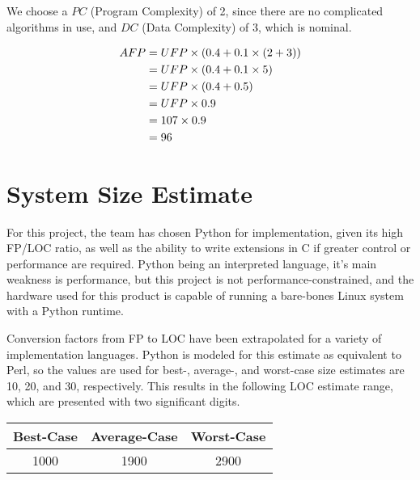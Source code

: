 \documentclass[11pt]{article}
\begin{document}
We choose a $PC$ (Program Complexity) of 2, since there are no complicated algorithms in use, and
$DC$ (Data Complexity) of 3, which is nominal.

\begin{align}
  AFP & = UFP \times (0.4 + 0.1 \times (2 + 3)) \notag \\
      & = UFP \times (0.4 + 0.1 \times 5) \notag \\
      & = UFP \times (0.4 + 0.5) \notag \\
      & = UFP \times 0.9 \notag \\
      & = 107 \times 0.9 \notag \\
      & = 96 \notag
\end{align}

\section{System Size Estimate}
For this project, the team has chosen Python for implementation, given its high FP/LOC ratio, as
well as the ability to write extensions in C if greater control or performance are required.  Python
being an interpreted language, it's main weakness is performance, but this project is not
performance-constrained, and the hardware used for this product is capable of running a bare-bones
Linux system with a Python runtime.

Conversion factors from FP to LOC have been extrapolated for a variety of implementation languages.
Python is modeled for this estimate as equivalent to Perl, so the values are used for best-,
average-, and worst-case size estimates are 10, 20, and 30, respectively.  This results in the
following LOC estimate range, which are presented with two significant digits.

\begin{center}
  \begin{tabular}[h]{ccc}
    {\bf Best-Case} & {\bf Average-Case} & {\bf Worst-Case} \\
    \hline
    1000             & 1900               & 2900
  \end{tabular}
\end{center}
\end{document}
